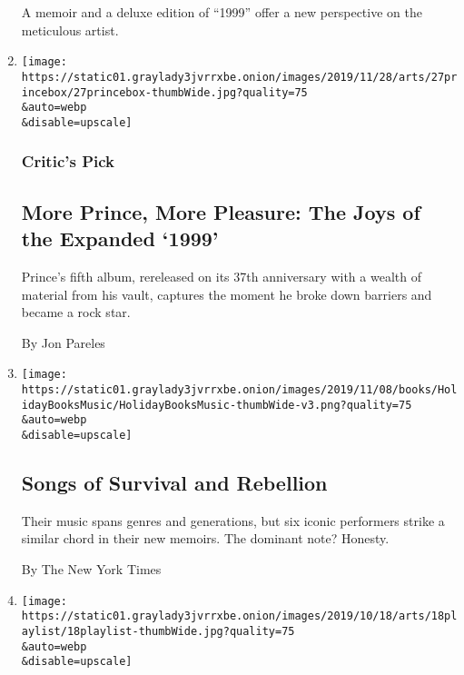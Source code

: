\begin{enumerate}
  A memoir and a deluxe edition of ``1999'' offer a new perspective on
  the meticulous artist.
\item
  \href{/2019/11/27/arts/music/prince-1999-review.html}{}

  \texttt{[image: https://static01.graylady3jvrrxbe.onion/images/2019/11/28/arts/27princebox/27princebox-thumbWide.jpg?quality=75\\\&auto=webp\\\&disable=upscale]}

  \hypertarget{critics-pick}{%
  \subsubsection{Critic's Pick}\label{critics-pick}}

  \hypertarget{more-prince-more-pleasure-the-joys-of-the-expanded-1999}{%
  \subsection{More Prince, More Pleasure: The Joys of the Expanded
  `1999'}\label{more-prince-more-pleasure-the-joys-of-the-expanded-1999}}

  Prince's fifth album, rereleased on its 37th anniversary with a wealth
  of material from his vault, captures the moment he broke down barriers
  and became a rock star.

  By Jon Pareles
\item
  \href{/interactive/2019/books/books-about-music.html}{}

  \texttt{[image: https://static01.graylady3jvrrxbe.onion/images/2019/11/08/books/HolidayBooksMusic/HolidayBooksMusic-thumbWide-v3.png?quality=75\\\&auto=webp\\\&disable=upscale]}

  \hypertarget{songs-of-survival-and-rebellion}{%
  \subsection{Songs of Survival and
  Rebellion}\label{songs-of-survival-and-rebellion}}

  Their music spans genres and generations, but six iconic performers
  strike a similar chord in their new memoirs. The dominant note?
  Honesty.

  By The New York Times
\item
  \href{/2019/10/18/arts/music/playlist-prince-katy-perry.html}{}

  \texttt{[image: https://static01.graylady3jvrrxbe.onion/images/2019/10/18/arts/18playlist/18playlist-thumbWide.jpg?quality=75\\\&auto=webp\\\&disable=upscale]}


\end{enumerate}
